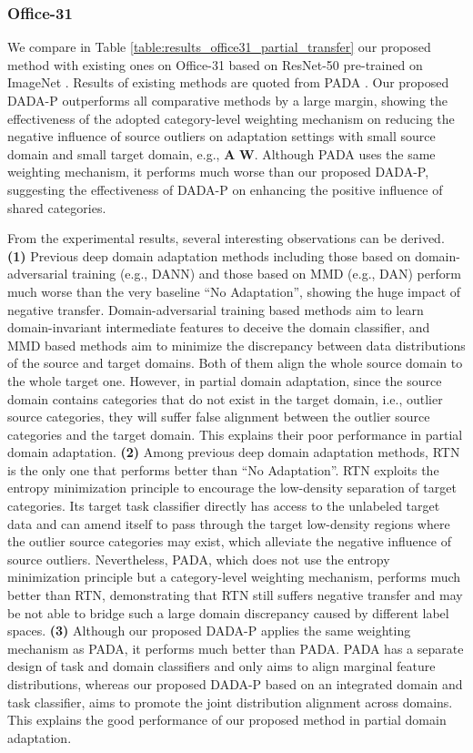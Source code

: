 \documentclass[letterpaper]{article} \usepackage{aaai20}  \usepackage{times}  \usepackage{helvet} \usepackage{courier}  \usepackage[hyphens]{url}  \usepackage{graphicx} \urlstyle{rm} \def\UrlFont{\rm}  \usepackage{graphicx}  \frenchspacing  \setlength{\pdfpagewidth}{8.5in}  \setlength{\pdfpageheight}{11in}
\begin{document}
\subsubsection{Office-31}
We compare in Table \ref{table:results_office31_partial_transfer} our proposed method with existing ones on Office-31 based on ResNet-50 \cite{resnet} pre-trained on ImageNet \cite{imagenet}. Results of existing methods are quoted from PADA \cite{pada}. Our proposed DADA-P outperforms all comparative methods by a large margin, showing the effectiveness of the adopted category-level weighting mechanism on reducing the negative influence of source outliers on adaptation settings with small source domain and small target domain, e.g., \textbf{A}  \textbf{W}. Although PADA uses the same weighting mechanism, it performs much worse than our proposed DADA-P, suggesting the effectiveness of DADA-P on enhancing the positive influence of shared categories.

From the experimental results, several interesting observations can be derived. \textbf{(1)} Previous deep domain adaptation methods including those based on domain-adversarial training (e.g., DANN) and those based on MMD (e.g., DAN) perform much worse than the very baseline ``No Adaptation'', showing the huge impact of negative transfer. Domain-adversarial training based methods aim to learn domain-invariant intermediate features to deceive the domain classifier, and MMD based methods aim to minimize the discrepancy between data distributions of the source and target domains. Both of them align the whole source domain to the whole target one. However, in partial domain adaptation, since the source domain contains categories that do not exist in the target domain, i.e., outlier source categories, they will suffer false alignment between the outlier source categories and the target
domain. This explains their poor performance in partial domain adaptation. \textbf{(2)} Among previous deep domain adaptation methods, RTN is the only one that performs better than ``No Adaptation''. RTN exploits the entropy minimization principle \cite{em} to encourage the low-density separation of target categories. Its target task classifier directly has access to the unlabeled target data and can amend itself to pass through the target low-density regions where the outlier source categories may exist, which alleviate the negative influence of source outliers. Nevertheless, PADA, which does not use the entropy minimization principle but a category-level weighting mechanism, performs much better than RTN, demonstrating that RTN still suffers negative transfer and may be not able to bridge such a large domain discrepancy caused by different label spaces. \textbf{(3)} Although our proposed DADA-P applies the same weighting mechanism as PADA, it performs much better than PADA. PADA has a separate design of task and domain classifiers and only aims to align marginal feature distributions, whereas our proposed DADA-P based on an integrated domain and task classifier, aims to promote the joint distribution alignment across domains. This explains the good performance of our proposed method in partial domain adaptation.
\end{document}
